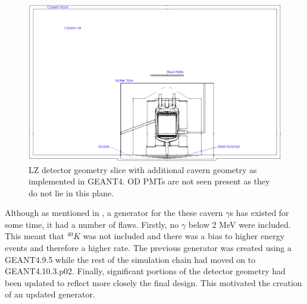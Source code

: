 \begin{figure}
\includegraphics[width=\textwidth]{Figures/Geometry/cavern_geometry_with_markings.png}
\centering
\caption{LZ detector geometry slice with additional cavern geometry as implemented in GEANT4. OD PMTs are not seen present as they do not lie in this plane.}
\label{fig:Cavern_Geometry}
\end{figure}

\par
Although as mentioned in \cite{rg_generator_ref}, a generator for the these cavern $\gamma$s has existed for some time, it had a number of flaws.
Firstly, no $\gamma$ below 2 MeV were included.
This meant that $^{40}K$ was not included and there was a bias to higher energy events and therefore a higher rate.
The previous generator was created using a GEANT4.9.5 while the rest of the simulation chain had moved on to GEANT4.10.3.p02. 
Finally, significant portions of the detector geometry had been updated to reflect more closely the final design. 
This motivated the creation of an updated generator.

